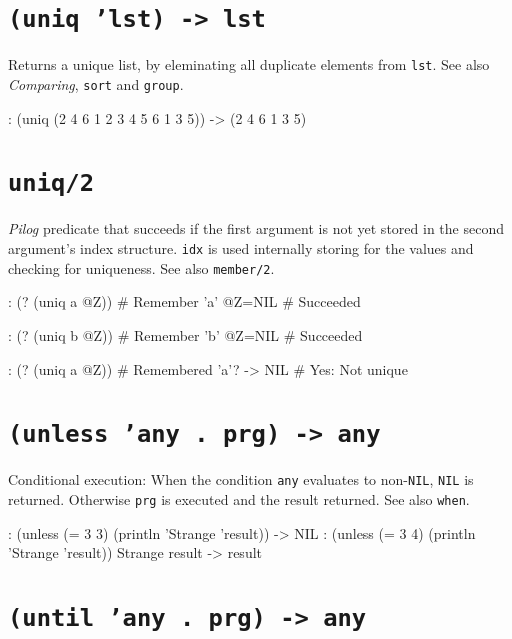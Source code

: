  
\section*{\texttt{(uniq 'lst) -> lst}}
\label{sec:func-ref-U-(uniq 'lst) -> lst}


Returns a unique list, by eleminating all duplicate elements from \texttt{lst}.
See also \emph{Comparing}, \texttt{sort} and \texttt{group}.


\begin{wideverbatim}
: (uniq (2 4 6 1 2 3 4 5 6 1 3 5))
-> (2 4 6 1 3 5)
\end{wideverbatim}

 
\section*{\texttt{uniq/2}}
\label{sec:func-ref-U-uniq/2}


\emph{Pilog} predicate that succeeds if the first argument
is not yet stored in the second argument's index structure. \texttt{idx} is
used internally storing for the values and checking for uniqueness. See
also \texttt{member/2}.


\begin{wideverbatim}
: (? (uniq a @Z))       # Remember 'a'
 @Z=NIL                 # Succeeded

: (? (uniq b @Z))       # Remember 'b'
 @Z=NIL                 # Succeeded

: (? (uniq a @Z))       # Remembered 'a'?
-> NIL                  # Yes: Not unique
\end{wideverbatim}

 
\section*{\texttt{(unless 'any . prg) -> any}}
\label{sec:func-ref-U-(unless 'any . prg) -> any}


Conditional execution: When the condition \texttt{any} evaluates to non-\texttt{NIL},
\texttt{NIL} is returned. Otherwise \texttt{prg} is executed and the result returned.
See also \texttt{when}.


\begin{wideverbatim}
: (unless (= 3 3) (println 'Strange 'result))
-> NIL
: (unless (= 3 4) (println 'Strange 'result))
Strange result
-> result
\end{wideverbatim}

 
\section*{\texttt{(until 'any . prg) -> any}}
\label{sec:func-ref-U-(until 'any . prg) -> any}


